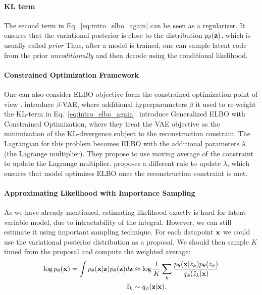 \paragraph{KL term}
The second term in Eq.~\ref{eq:intro_elbo_again} can be seen as a regularizer. It ensures that the variational posterior is close to the distribution $p_{\theta}({\mathbf{z}})$, which is usually called \textit{prior}
Thus, after a model is trained, one can sample latent code from the prior \textit{uncoditionally} and then decode using the conditional likelihood. 

\paragraph{Constrained Optimization Framework}
One can also consider ELBO objective form the constrained optimization point of view \citep{higgins2017beta, rezende2018taming}. \citet{higgins2017beta} introduce $\beta$-VAE, where additional hyperparameters $\beta$ it used to re-weight the KL-term in Eq.~\ref{eq:intro_elbo_again}. \citet{rezende2018taming} introduce Generalized ELBO with Constrained Optimization, where they treat the VAE objective as the minimization of the KL-divergence subject to the reconstruction constrain. The Lagrangian for this problem becomes ELBO with the additional parameters $\lambda$ (the Lagrange multiplier). They propose to use moving average of the constraint to update the Lagrange multiplier.
\citet{klushyn2019learning} proposes a different rule to update $\lambda$, which ensures that model optimizes ELBO once the reconstruction constraint is met. 

\paragraph{Approximating Likelihood with Importance Sampling}

As we have already mentioned, estimating likelihood exactly is hard for latent variable model, due to intractability of the integral. However, we can still estimate it using important sampling technique. For each datapoint ${\mathbf{x}}$ we could use the variational posterior distribution as a proposal. We should then sample $K$ timed from the proposal and compute the weighted average:
\begin{equation}
\begin{aligned}
    \log p_{\theta}({\mathbf{x}}) = \int p_{\theta}({\mathbf{x}}|{\mathbf{z}})p_{\theta}({\mathbf{z}})d{\mathbf{z}} &\approx \log \frac1K \sum_k\frac{p_{\theta}({\mathbf{x}}|\tilde{z}_k)p_{\theta}(\tilde{z}_k)}{q_{\phi}(\tilde{z}_k|{\mathbf{x}})}\\
    \tilde{z}_k &\sim q_{\phi}({\mathbf{z}}|{\mathbf{x}}).
\end{aligned}
\end{equation}

